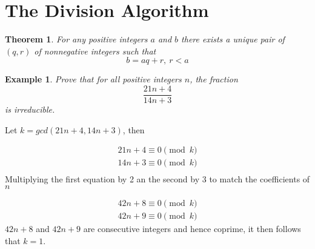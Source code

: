 \documentclass[11pt]{article}
\newtheorem{theorem}{Theorem}
\newtheorem{example}{Example}
\begin{document}
\section*{The Division Algorithm}

\begin{theorem}
  For any positive integers $a$ and $b$ there exists a unique pair of $(q, r)$ of nonnegative integers such that $$b = aq + r ,\ r < a$$
\end{theorem}

\begin{example}
  Prove that for all positive integers $n$, the fraction $$\frac{21n + 4}{14n + 3}$$ is irreducible.
\end{example}
\noindent Let $k = gcd(21n + 4, 14n + 3)$, then

\begin{align*}
  21n + 4 \equiv 0 \pmod{k} \\
  14n + 3 \equiv 0 \pmod{k} \\
\end{align*}
Multiplying the first equation by 2 an the second by 3 to match the coefficients of $n$

\begin{align*}
  42n + 8 \equiv 0 \pmod{k} \\
  42n + 9 \equiv 0 \pmod{k}
\end{align*}
$42n + 8$ and $42n + 9$ are consecutive integers and hence coprime, it then follows that $k = 1$.
\end{document}
